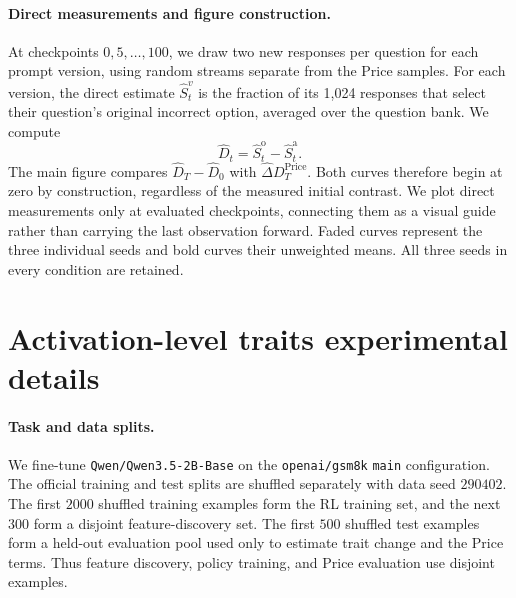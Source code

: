 \paragraph{Direct measurements and figure construction.}
At checkpoints $0,5,\ldots,100$, we draw two new responses per question
for each prompt version, using random streams separate from the Price
samples. For each version, the direct estimate $\widehat S_t^v$ is the
fraction of its 1,024 responses that select their question's original
incorrect option, averaged over the question bank. We compute
\[
 \widehat D_t=\widehat S_t^{\mathrm{o}}-\widehat S_t^{\mathrm{a}}.
\]
The main figure compares $\widehat D_T-\widehat D_0$ with
$\widehat\Delta D_T^{\mathrm{Price}}$. Both curves therefore begin at
zero by construction, regardless of the measured initial contrast.
We plot direct measurements only at evaluated checkpoints, connecting
them as a visual guide rather than carrying the last observation forward.
Faded curves represent the three individual seeds and bold curves their
unweighted means. All three seeds in every condition are retained.


\section{Activation-level traits experimental details}\label{app:act-level-traits}
\paragraph{Task and data splits.}
We fine-tune \texttt{Qwen/Qwen3.5-2B-Base} on the
\texttt{openai/gsm8k} \texttt{main} configuration.  The official training
and test splits are shuffled separately with data seed $290402$.  The first
$2000$ shuffled training examples form the RL training set, and the next
$300$ form a disjoint feature-discovery set.  The first $500$ shuffled test
examples form a held-out evaluation pool used only to estimate trait change
and the Price terms.  Thus feature discovery, policy training, and Price
evaluation use disjoint examples.

